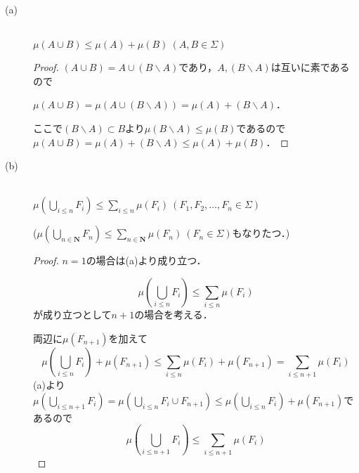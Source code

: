 \documentclass{jsarticle}
\begin{document}
\begin{description}
    \item[(a)]\mbox{}\\
        $\mu(A\cup B)\leq\mu(A)+\mu(B) \ (A,B\in\Sigma)$
        \\
        
        \begin{proof}
            $(A\cup B)=A\cup (B\backslash A)$であり，$A,(B\backslash A)$は互いに素であるので
            
            $\mu(A\cup B)=\mu(A\cup (B\backslash A))=\mu(A)+(B\backslash A)$．
            
            ここで$(B\backslash A)\subset B$より$\mu(B\backslash A)\leq\mu(B)$であるので
            $\mu(A\cup B)=\mu(A)+(B\backslash A)\leq\mu(A)+\mu(B)$．
        \end{proof}
        
    \item[(b)]\mbox{}\\
        $\mu(\bigcup_{i\leq n}F_i)\leq \sum_{i\leq n}\mu(F_i) \ (F_1,F_2,\dots,F_n\in\Sigma)$

        ($\mu(\bigcup_{n\in\mathbf{N}}F_n)\leq \sum_{n\in\mathbf{N}}\mu(F_n) \ (F_n\in\Sigma)$もなりたつ．)
        \\
        
        \begin{proof}
            $n=1$の場合は(a)より成り立つ．
            
            \begin{equation}
                \mu (\bigcup_{i\leq n}F_i) \leq \sum_{i\leq n}\mu(F_i) \nonumber
            \end{equation}が成り立つとして$n+1$の場合を考える．
            
            両辺に$\mu(F_{n+1})$を加えて
            \begin{equation}
                \mu(\bigcup_{i\leq n}F_i)+\mu(F_{n+1}) \leq \sum_{i\leq n}\mu(F_i)+\mu(F_{n+1})= \sum_{i\leq n+1}\mu(F_i) \nonumber
            \end{equation}
            (a)より$\mu(\bigcup_{i\leq n+1}F_i) = \mu(\bigcup_{i\leq n}F_i \cup F_{n+1}) \leq \mu(\bigcup_{i\leq n}F_i)+\mu(F_{n+1})$であるので
            \begin{equation}
                \mu(\bigcup_{i\leq n+1}F_i) \leq \sum_{i\leq n+1}\mu(F_i) \nonumber
            \end{equation}
        \end{proof}
        
\end{description}
\end{document}
